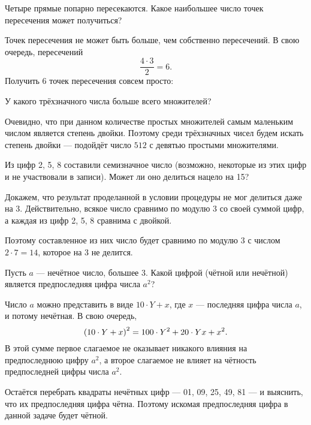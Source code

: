 
\begin{itemize}

	\itA Четыре прямые попарно пересекаются. Какое наибольшее число \linebreak точек пересечения может получиться?
	
	\itr Точек пересечения не может быть больше, чем собственно пересечений. В свою очередь, пересечений
	$$\frac{4 \cdot 3}{2} = 6.$$
	Получить 6 точек пересечения совсем просто:
	
	\begin{center}  \end{center}

\end{itemize}


\begin{itemize}

	\itA У какого трёхзначного числа больше всего множителей?
	
	\itr Очевидно, что при данном количестве простых множителей самым маленьким числом является степень двойки. Поэтому среди трёхзначных чисел будем искать степень двойки — подойдёт число $512$ с девятью простыми множителями.
	
	\itB Из цифр 2, 5, 8 составили семизначное число (возможно, некоторые из этих цифр и не участвовали в записи). Может ли оно делиться нацело на 15?
	
	\itr Докажем, что результат проделанной в условии процедуры не мог делиться даже на 3. Действительно, всякое число сравнимо по модулю 3 со своей суммой цифр, а каждая из цифр 2, 5, 8 сравнима с двойкой.
	
	Поэтому составленное из них число будет сравнимо по модулю 3 с числом $2 \cdot 7 = 14$, которое на 3 не делится.
	
	\itC Пусть $a$ — нечётное число, большее 3. Какой цифрой (чётной или нечётной) является предпоследняя цифра числа $a^2$?
	
	\itr Число $a$ можно представить в виде $10 \cdot Y + x$, где $x$ — последняя цифра числа $a$, и потому нечётная. В свою очередь,
	$$\left( 10 \cdot Y + x\right)^2 = 100 \cdot Y^2 + 20 \cdot Yx + x^2.$$
	В этой сумме первое слагаемое не оказывает никакого влияния на предпоследнюю цифру $a^2$, а второе слагаемое не влияет на чётность предпоследней цифры числа $a^2$.
	
	Остаётся перебрать квадраты нечётных цифр — 01, 09, 25, 49, 81 — и выяснить, что их предпоследняя цифра чётна. Поэтому искомая предпоследняя цифра в данной задаче будет чётной.

\end{itemize}

